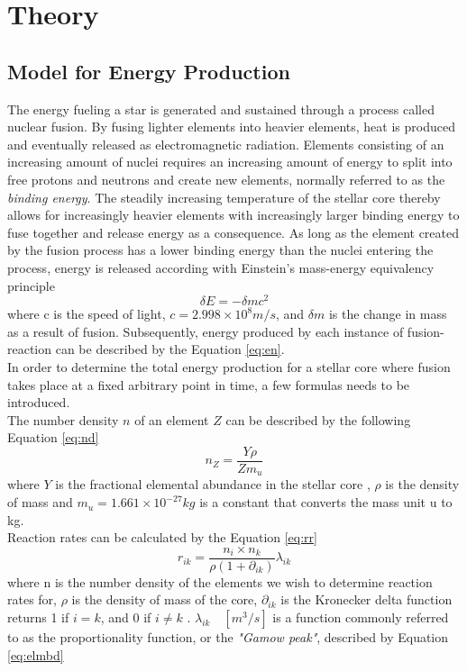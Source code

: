 \documentclass[10pt, nofootinbib, twocolumn]{revtex4-1}
\begin{document}
\section{Theory}\label{sec:theory}
\subsection{Model for Energy Production}
The energy fueling a star is generated and sustained through a process called nuclear fusion. By fusing lighter elements into heavier elements, heat is produced and eventually released as electromagnetic radiation. Elements consisting of an increasing amount of nuclei requires an increasing amount of energy to split into free protons and neutrons and create new elements, normally referred to as the \textit{binding energy}. The steadily increasing temperature of the stellar core thereby allows for increasingly heavier elements with increasingly larger binding energy to fuse together and release energy as a consequence. As long as the element created by the fusion process has a lower binding energy than the nuclei entering the process, energy is released according with Einstein's mass-energy equivalency principle \cite{ast}
\begin{equation}
    \delta E = -\delta m c^2 \label{eq:en}
\end{equation}
where c is the speed of light, $c=2.998\times10^8m/s$, and $\delta m$ is the change in mass as a result of fusion. Subsequently, energy produced by each instance of fusion-reaction can be described by the Equation \eqref{eq:en}. \\

In order to determine the total energy production for a stellar core where fusion takes place at a fixed arbitrary point in time, a few formulas needs to be introduced. \\

\newpage
The number density $n$ of an element $Z$ can be described by the following Equation \eqref{eq:nd}
\begin{equation}
    n_Z = \frac{Y\rho}{Zm_u} \label{eq:nd}
\end{equation}
where $Y$ is the fractional elemental abundance in the stellar core \cite[p.~25]{ast}, $\rho$ is the density of mass and $m_u=1.661\times10^{-27}kg$ is a constant that converts the mass unit u to kg.  \\

Reaction rates can be calculated by the Equation \eqref{eq:rr}
\begin{equation}
    r_{ik} = \frac{n_i\times n_k}{\rho (1+\partial_{ik})}\lambda_{ik} \label{eq:rr}
\end{equation}
where n is the number density of the elements we wish to determine reaction rates for, $\rho$ is the density of mass of the core, $\partial_{ik}$ is the Kronecker delta function
returns 1 if $i=k$, and 0 if $i\neq k$ \cite{quant}. $\lambda_{ik} \quad [m^3/s]$ is a function commonly referred to as the proportionality function, or the \textit{"Gamow peak"}, described by Equation \eqref{eq:elmbd}
\end{document}
